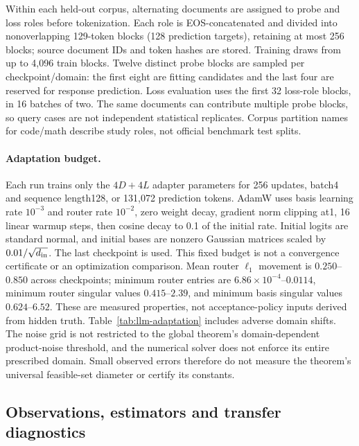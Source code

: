 Within each held-out corpus, alternating documents are assigned to probe
 and loss roles before tokenization. Each role is EOS-concatenated and
 divided into nonoverlapping 129-token blocks (128 prediction targets),
 retaining at most 256 blocks; source document IDs and token hashes are
 stored. Training draws from up to 4,096 train blocks. Twelve distinct
 probe blocks are sampled per checkpoint/domain: the first eight are
 fitting candidates and the last four are reserved for response prediction.
Loss evaluation uses the first 32 loss-role blocks, in 16 batches of two.
The same documents can contribute multiple probe blocks, so query cases
 are not independent statistical replicates. Corpus partition names for
 code/math describe study roles, not official benchmark test splits.

\paragraph{Adaptation budget.}
Each run trains only the $4D+4L$ adapter parameters for 256 updates,
 batch4 and sequence length128, or 131,072 prediction tokens. AdamW uses
 basis learning rate $10^{-3}$ and router rate $10^{-2}$, zero weight decay,
 gradient norm clipping at1, 16 linear warmup steps, then cosine decay to
0.1 of the initial rate. Initial logits are standard normal, and initial
 bases are nonzero Gaussian matrices scaled by $0.01/\sqrt{d_{\rm in}}$.
The last checkpoint is used. This fixed budget is not a convergence
 certificate or an optimization comparison. Mean router $\ell_1$ movement
 is $0.250$--$0.850$ across checkpoints; minimum router entries are
$6.86\times10^{-4}$--$0.0114$, minimum router singular values
$0.415$--$2.39$, and minimum basis singular values $0.624$--$6.52$.
These are measured properties, not acceptance-policy inputs derived from
hidden truth. Table~\ref{tab:llm-adaptation} includes adverse domain shifts.
The noise grid is not restricted to the global theorem's domain-dependent
 product-noise threshold, and the numerical solver does not enforce its
 entire prescribed domain. Small observed errors therefore do not measure
 the theorem's universal feasible-set diameter or certify its constants.



\subsection{Observations, estimators and transfer diagnostics}

